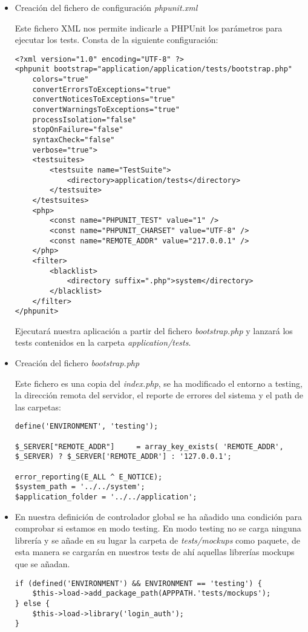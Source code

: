 \begin{itemize}
    \item Creación del fichero de configuración \emph{phpunit.xml}

        Este fichero XML nos permite indicarle a PHPUnit los parámetros para ejecutar los tests. Consta de la siguiente configuración:

                \begin{lstlisting}
<?xml version="1.0" encoding="UTF-8" ?>
<phpunit bootstrap="application/application/tests/bootstrap.php"
    colors="true"
    convertErrorsToExceptions="true"
    convertNoticesToExceptions="true"
    convertWarningsToExceptions="true"
    processIsolation="false"
    stopOnFailure="false"
    syntaxCheck="false"
    verbose="true">
    <testsuites>
        <testsuite name="TestSuite">
            <directory>application/tests</directory>
        </testsuite>
    </testsuites>
    <php>
        <const name="PHPUNIT_TEST" value="1" />
        <const name="PHPUNIT_CHARSET" value="UTF-8" />
        <const name="REMOTE_ADDR" value="217.0.0.1" />
    </php>
    <filter>
        <blacklist>
            <directory suffix=".php">system</directory>
        </blacklist>
    </filter>
</phpunit>
                \end{lstlisting}

        Ejecutará nuestra aplicación a partir del fichero \emph{bootstrap.php} y lanzará los tests contenidos en la carpeta \emph{application/tests}.

    \item Creación del fichero \emph{bootstrap.php}

        Este fichero es una copia del \emph{index.php}, se ha modificado el entorno a testing, la dirección remota del servidor, el reporte de errores del sistema y el path de las carpetas:
                \begin{lstlisting}
define('ENVIRONMENT', 'testing');

$_SERVER["REMOTE_ADDR"]     = array_key_exists( 'REMOTE_ADDR', $_SERVER) ? $_SERVER['REMOTE_ADDR'] : '127.0.0.1';

error_reporting(E_ALL ^ E_NOTICE);
$system_path = '../../system';
$application_folder = '../../application';
                \end{lstlisting}

    \item En nuestra definición de controlador global se ha añadido una condición para comprobar si estamos en modo testing. En modo testing no se carga ninguna librería y se añade en su lugar la carpeta de \emph{tests/mockups} como paquete, de esta manera se cargarán en nuestros tests de ahí aquellas librerías mockups que se añadan.

                \begin{lstlisting}
if (defined('ENVIRONMENT') && ENVIRONMENT == 'testing') {
    $this->load->add_package_path(APPPATH.'tests/mockups');
} else {
    $this->load->library('login_auth');
}
                \end{lstlisting}
\end{itemize}